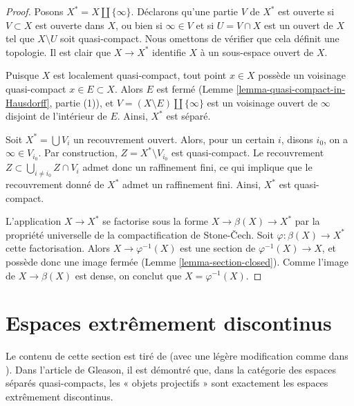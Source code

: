 \begin{proof}
Posons $X^* = X \amalg \{\infty\}$. Déclarons qu'une partie $V$ de $X^*$ est
ouverte si $V \subset X$ est ouverte dans $X$, ou bien si $\infty \in V$ et si
$U = V \cap X$ est un ouvert de $X$ tel que $X \setminus U$ soit quasi-compact.
Nous omettons de vérifier que cela définit une topologie. Il est clair
que $X \to X^*$ identifie $X$ à un sous-espace ouvert de $X$.

\medskip\noindent
Puisque $X$ est localement quasi-compact, tout point $x \in X$ possède un
voisinage quasi-compact $x \in E \subset X$. Alors $E$
est fermé (Lemme \ref{lemma-quasi-compact-in-Hausdorff}, partie (1)), et
$V = (X \setminus E) \amalg \{\infty\}$ est un voisinage ouvert
de $\infty$ disjoint de l'intérieur de $E$. Ainsi, $X^*$ est séparé.

\medskip\noindent
Soit $X^* = \bigcup V_i$ un recouvrement ouvert. Alors, pour un certain $i$,
disons $i_0$, on a $\infty \in V_{i_0}$. Par construction,
$Z = X^* \setminus V_{i_0}$ est quasi-compact. Le recouvrement
$Z \subset \bigcup_{i \not = i_0} Z \cap V_i$ admet donc un raffinement fini,
ce qui implique que le recouvrement donné de $X^*$ admet un raffinement fini.
Ainsi, $X^*$ est quasi-compact.

\medskip\noindent
L'application $X \to X^*$ se factorise sous la forme
$X \to \beta(X) \to X^*$ par la propriété universelle de la compactification
de Stone-{\v C}ech. Soit
$\varphi : \beta(X) \to X^*$ cette factorisation.
Alors $X \to \varphi^{-1}(X)$ est une section de
$\varphi^{-1}(X) \to X$, et possède donc une image fermée
(Lemme \ref{lemma-section-closed}).
Comme l'image de $X \to \beta(X)$ est dense, on conclut que
$X = \varphi^{-1}(X)$.
\end{proof}








\section{Espaces extrêmement discontinus}
\label{section-extremally-disconnected}

\noindent
Le contenu de cette section est tiré de \cite{Gleason}
(avec une légère modification comme dans \cite{Rainwater}).
Dans l'article de Gleason, il est démontré que, dans la catégorie des espaces
séparés quasi-compacts, les « objets projectifs » sont exactement les espaces
extrêmement discontinus.

